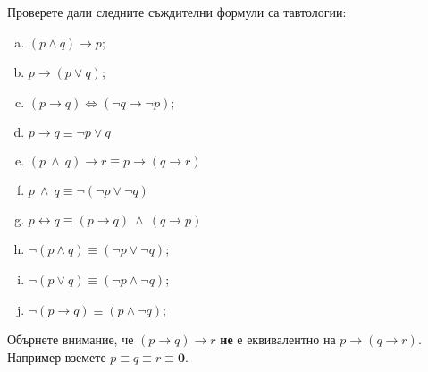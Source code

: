 \begin{problem}
  Проверете дали следните съждителни формули са тавтологии:
  \begin{enumerate}[a)]
  \item
    $(p\wedge q)\rightarrow p$;
  \item
    $p\rightarrow(p\vee q)$;
  \item
    $(p\rightarrow q) \iff (\neg q \rightarrow \neg p)$;
  \item
    $p\rightarrow q \equiv \neg p \vee q$
  \item
    $(p\ \wedge\ q) \rightarrow r \equiv p \rightarrow (q\rightarrow r)$
  \item
    $p\ \wedge\ q \equiv \neg(\neg p \vee \neg q)$
  \item
    $p \leftrightarrow q \equiv (p\rightarrow q)\ \wedge\ (q\rightarrow p)$
  \item
    $\neg(p\wedge q) \equiv (\neg p \vee \neg q)$;
  \item
    $\neg(p\vee q) \equiv (\neg p \wedge \neg q)$;
  \item
    $\neg(p\rightarrow q) \equiv (p\wedge \neg q)$;
  \end{enumerate}
\end{problem}

\begin{remark}
  Обърнете внимание, че $(p\rightarrow q)\rightarrow r$ {\bf не} е еквивалентно на $p\rightarrow (q\rightarrow r)$.
  Например вземете $p \equiv q \equiv r \equiv \mathbf{0}$.
\end{remark}


